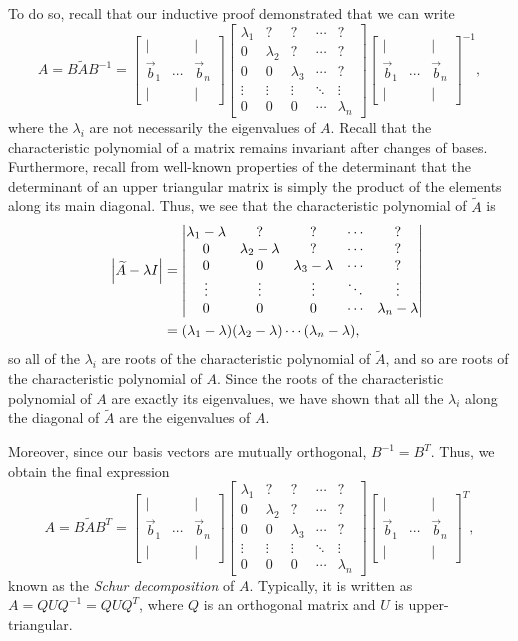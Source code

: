 \documentclass[letterpaper]{article}
\theoremstyle{remark}
\renewcommand{\tilde}[1]{\widetilde{#1}}
\newcommand{\mat}[1]{\ensuremath{\begin{bmatrix}#1\end{bmatrix}}}
\newcommand{\cat}[1]{\ensuremath{\begin{vmatrix}#1\end{vmatrix}}}
\newcommand{\eqn}[1]{\begin{alignat*}{2}#1\end{alignat*}}
\begin{document}
To do so, recall that our inductive proof demonstrated that we can write
\[
    A = B\tilde{A}B^{-1} = \mat{| & & | \\ \vec{b}_1 & \cdots & \vec{b}_n \\ | & & |}\mat{
    \lambda_1 & ? & ? & \cdots & ? \\ 
    0 & \lambda_2 & ? & \cdots & ? \\
    0 & 0 & \lambda_3 & \cdots & ? \\
    \vdots & \vdots & \vdots & \ddots & \vdots \\
    0 & 0 & 0 & \cdots & \lambda_n}\mat{| & & | \\ \vec{b}_1 & \cdots & \vec{b}_n \\ | & & |}^{-1},
\]
where the $\lambda_i$ are not necessarily the eigenvalues of $A$. Recall that the characteristic polynomial of a matrix remains invariant after changes of bases. Furthermore, recall from well-known properties of the determinant that the determinant of an upper triangular matrix is simply the product of the elements along its main diagonal. Thus, we see that the characteristic polynomial of $\tilde{A}$ is
\eqn{
    && \abs{\tilde{A} - \lambda I} &= \cat{
    \lambda_1 - \lambda & ? & ? & \cdots & ? \\ 
    0 & \lambda_2 - \lambda & ? & \cdots & ? \\
    0 & 0 & \lambda_3 - \lambda & \cdots & ? \\
    \vdots & \vdots & \vdots & \ddots & \vdots \\
    0 & 0 & 0 & \cdots & \lambda_n - \lambda} \\
    &&&= (\lambda_1 - \lambda)(\lambda_2 - \lambda) \cdots (\lambda_n - \lambda),
}
so all of the $\lambda_i$ are roots of the characteristic polynomial of $\tilde{A}$, and so are roots of the characteristic polynomial of $A$. Since the roots of the characteristic polynomial of $A$ are exactly its eigenvalues, we have shown that all the $\lambda_i$ along the diagonal of $\tilde{A}$ are the eigenvalues of $A$.

Moreover, since our basis vectors are mutually orthogonal, $B^{-1} = B^T$. Thus, we obtain the final expression
\[
    A = B\tilde{A}B^T = \mat{| & & | \\ \vec{b}_1 & \cdots & \vec{b}_n \\ | & & |}\mat{
    \lambda_1 & ? & ? & \cdots & ? \\ 
    0 & \lambda_2 & ? & \cdots & ? \\
    0 & 0 & \lambda_3 & \cdots & ? \\
    \vdots & \vdots & \vdots & \ddots & \vdots \\
    0 & 0 & 0 & \cdots & \lambda_n}\mat{| & & | \\ \vec{b}_1 & \cdots & \vec{b}_n \\ | & & |}^T,
\]
known as the \emph{Schur decomposition} of $A$. Typically, it is written as $A = QUQ^{-1} = QUQ^T$, where $Q$ is an orthogonal matrix and $U$ is upper-triangular.
\end{document}
